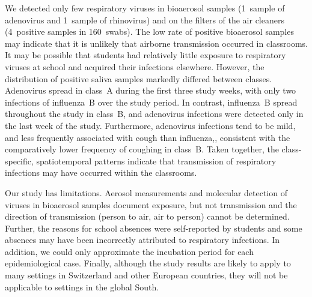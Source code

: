 \documentclass[fleqn,11pt]{wlscirep}
\begin{document}
We detected only few respiratory viruses in bioaerosol samples (1~sample of adenovirus and 1~sample of rhinovirus) and on the filters of the air cleaners (4~positive samples in 160~swabs). The low rate of positive bioaerosol samples may indicate that it is unlikely that airborne transmission occurred in classrooms. It may be possible that students had relatively little exposure to respiratory viruses at school and acquired their infections elsewhere. However, the distribution of positive saliva samples markedly differed between classes. Adenovirus spread in class~A during the first three study weeks, with only two infections of influenza~B over the study period. In contrast, influenza~B spread throughout the study in class~B, and adenovirus infections were detected only in the last week of the study. Furthermore, adenovirus infections tend to be mild\cite{Kunz2010CIDR}, and less frequently associated with cough than influenza\cite{Ma2018RMV},, consistent with the comparatively lower frequency of coughing in class~B. Taken together, the class-specific, spatiotemporal patterns indicate that transmission of respiratory infections may have occurred within the classrooms. 


Our study has limitations. Aerosol measurements and molecular detection of viruses in bioaerosol samples document exposure, but not transmission and the direction of transmission (person to air, air to person) cannot be determined. Further, the reasons for school absences were self-reported by students and some absences may have been incorrectly attributed to respiratory infections. In addition, we could only approximate the incubation period for each epidemiological case. Finally, although the study results are likely to apply to many settings in Switzerland and other European countries, they will not be applicable to settings in the global South. 


\end{document}
